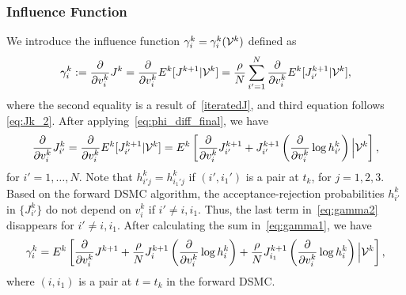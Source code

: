 \documentclass[12pt,nopreprintline]{elsarticle}
\begin{document}
\subsubsection{Influence Function}\label{section:Influence}
We introduce the influence function $\gamma_i^k=\gamma_i^k({\cal V}^k)$ defined as
\begin{equation}\label{eq:gamma1}
\gamma_i^k := \frac{\partial}{\partial v_i^k}J^k = \frac{\partial}{\partial v_i^k}  E^k [ J^{k+1} | {\cal V}^k ] =  \frac{\rho}{N }\sum_{i'=1}^N \frac{\partial  }{\partial v_i^k}  E^k[   J_{i'}^{k+1} | {\cal V}^k ],
\end{equation}
where the second equality is a result of~\eqref{iteratedJ}, and third equation follows \eqref{eq:Jk_2}. 
After applying~\eqref{eq:phi_diff_final}, we have
\begin{equation}\label{eq:gamma2}
\frac{\partial  }{\partial v_i^k} J_{i'}^{k}  = \frac{\partial  }{\partial v_i^k}  E^k [ J_{i'}^{k+1} | {\cal V}^k ] = E^k \left[ \frac{\partial}{\partial v_i^k}  J_{i'}^{k+1}  + J_{i'}^{k+1} \left(\frac{\partial}{\partial v_i^k} \log h_{i'}^k \right) \Big| {\cal V}^k   \right],
\end{equation}
for $i' = 1,\ldots, N$. Note that $h_{i'j}^k = h_{i_1' j}^k$ if $(i',i_1')$ is a pair at $t_k$, for $j=1,2,3$.
Based on the forward DSMC algorithm, the acceptance-rejection probabilities $h_{i'}^k$ in $\{J_{i'}^k\}$  do not depend on $v_i^k$ if $i' \neq i, i_1$. Thus, the last term in~\eqref{eq:gamma2} disappears for $i' \neq i, i_1$. 
After calculating the sum in~\eqref{eq:gamma1}, we have
\begin{equation}
\gamma_i^k =  E^k\left[  \frac{\partial}{\partial v_i^k } J^{k+1}  + \frac{\rho}{N}J^{k+1}_i \left(\frac{\partial}{\partial v_i^k}\log h^k_i \right)  + \frac{\rho}{N} J^{k+1}_{i_1} \left(\frac{\partial}{\partial v_i^k}\log h^k_i \right) \Big| {\cal V}^k  \right], \label{iteratedGamma}
\end{equation}
where $(i,i_1)$ is a pair at $t=t_k$ in the forward DSMC.
\end{document}
